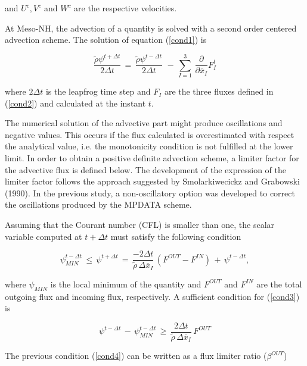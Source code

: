 \noindent and $U^{c},V^{c}$ and $W^{c}$ are the respective velocities.

At Meso-NH, the advection of a quantity is solved with a second order centered advection
scheme. The solution of equation (\ref{cond1}) is

\begin{equation}
\dfrac{\tilde{\rho} \psi^{t+\Delta t}} {2 \Delta t} \, = \,
\dfrac{\tilde{\rho} \psi^{t-\Delta t}} {2 \Delta t} \,
 \, - \, \sum_{I=1}^{3} \,  \dfrac{\partial }{\partial \overline{x}_I}
F_{I}^{t}
\end{equation}

\noindent where $2\Delta t$ is the leapfrog time step and $F_I$ are the three fluxes defined
in (\ref{cond2}) and calculated at the instant $t$.

The numerical solution of the advective part might produce oscillations and
negative values. This occurs if
the flux calculated is overestimated with respect the analytical value, i.e. the
monotonicity condition is not fulfilled at the lower limit. In order to obtain a
positive definite advection scheme, a limiter factor for the advective flux is
defined below. The development of the expression of the limiter factor follows
the approach suggested by Smolarkiwecickz and Grabowski (1990). In the previous
study, a non-oscillatory option was developed to correct the oscillations produced by
the MPDATA scheme.

Assuming that the Courant number (CFL) is
smaller than one, the scalar variable computed at $t+\Delta t$ must satisfy the
following condition

\begin{equation}
\label{cond3}
\psi_{MIN}^{t-\Delta t}\,\leq \,
\psi^{t+\Delta t} \, = \,
\dfrac{-2 \Delta t}{\tilde{\rho}\,\Delta \overline{x}_{I}}\, (F^{OUT}-F^{IN}) \,+\,
\psi^{t-\Delta t},
\end{equation}

\noindent where $\psi_{MIN}$ is the local minimum of the quantity and $F^{OUT}$ and $F^{IN}$ are
the total
outgoing flux and incoming flux, respectively. A sufficient condition for (\ref{cond3}) is

\begin{equation}
\label{cond4}
\psi^{t-\Delta t}  \, - \,
\psi_{MIN}^{t-\Delta t}\,\geq \,
\dfrac{2 \Delta t}{\tilde{\rho}\,\Delta \overline{x}_{I}}\, F^{OUT}
\end{equation}

The previous condition (\ref{cond4}) can be written as a flux limiter ratio ($\beta^{OUT}$)

